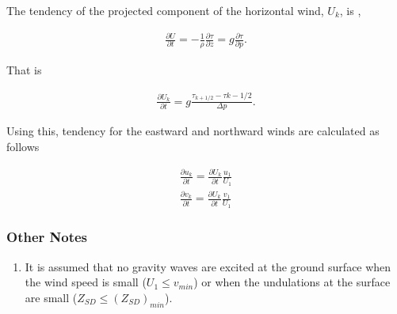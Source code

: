 The tendency of the projected component of the horizontal wind, \(U_{k}\), is ,

\begin{eqnarray}
  \frac{\partial U}{\partial t}
        = - \frac{1}{\rho} \frac{\partial \tau}{\partial z}
        = g  \frac{\partial \tau}{\partial p}.
\end{eqnarray}

That is

\begin{eqnarray}
  \frac{\partial U_{k}}{\partial t}
        =  g  \frac{\tau_{k+1/2} - \tau{k-1/2}}{\Delta p}.
\end{eqnarray}

Using this, tendency for the eastward and northward winds are calculated as follows

\begin{eqnarray}
  \frac{\partial u_{k}}{\partial t}  =
           \frac{\partial U_{k}}{\partial t} \frac{u_{1}}{U_{1}} \\
  \frac{\partial v_{k}}{\partial t}  =
           \frac{\partial U_{k}}{\partial t} \frac{v_{1}}{U_{1}}
\end{eqnarray}

\hypertarget{other-notes}{%
\subsubsection{Other Notes}\label{other-notes}}

\begin{enumerate}
\def\labelenumi{\arabic{enumi}.}
\tightlist
\item
  It is assumed that no gravity waves are excited at the ground surface when the wind speed is small (\(U_{1} \le v_{min}\)) or when the undulations at the surface are small
  (\(Z_{SD} \le (Z_{SD})_{min}\)).
\end{enumerate}
